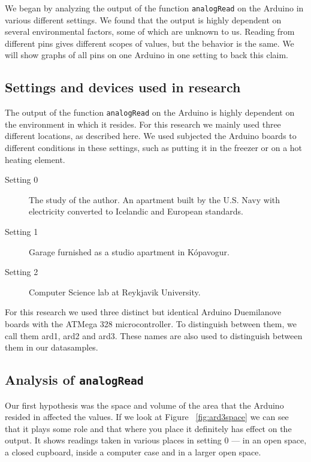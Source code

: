 \documentclass[a4paper]{article}           %
\begin{document}
We began by analyzing the output of the function \texttt{analogRead} on the Arduino in various different settings. We found that the output is highly dependent on several environmental factors, some of which are unknown to us. Reading from different pins gives different scopes of values, but the behavior is the same. We will show graphs of all pins on one Arduino in one setting to back this claim.


\subsection{Settings and devices used in research}

The output of the function \texttt{analogRead} on the Arduino is highly dependent on the environment in which it resides. For this research we mainly used three different locations, as described here. We used subjected the Arduino boards to different conditions in these settings, such as putting it in the freezer or on a hot heating element. 

\begin{description}
\item[Setting 0] The study of the author. An apartment built by the U.S. Navy with electricity converted to Icelandic and European standards. 
\item[Setting 1] Garage furnished as a studio apartment in Kópavogur. 
\item[Setting 2] Computer Science lab at Reykjavik University. 
\end{description}

For this research we used three distinct but identical Arduino Duemilanove boards with the ATMega 328 microcontroller. To distinguish between them, we call them ard1, ard2 and ard3. These names are also used to distinguish between them in our datasamples. 

\subsection{Analysis of \texttt{analogRead}}

Our first hypothesis was the space and volume of the area that the Arduino resided in affected the values. If we look at Figure ~\ref{fig:ard3space} we can see that it plays some role and that where you place it definitely has effect on the output. It shows readings taken in various places in setting 0 --- in an open space, a closed cupboard, inside a computer case and in a larger open space. 
\end{document}
